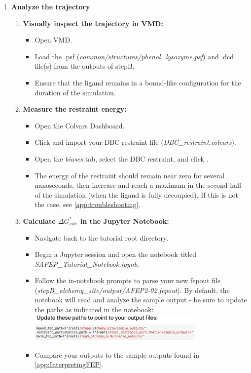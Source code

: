 \documentclass[9pt,tutorial]{Styling/livecoms}
\newcommand{\filepath}[1]{\textit{#1}}
\newcommand{\button}[1]{
  \inlineBox[gray]{\texttt{#1}}
}
\newcommand{\menu}[1]{
  \textit{#1}
}
\begin{document}
\begin{enumerate}
    \item \textbf{Analyze the trajectory}

    
    \begin{enumerate}[label=\alph*., ref=\theenumi.\alph*] \label{step:analyzeSite}
        \item \textbf{Visually inspect the trajectory in VMD:}
        \begin{itemize}
            \item Open VMD.
            \item Load the .psf (\filepath{common/structures/phenol\_lysozyme.psf}) and .dcd file(s) from the outputs of stepB.
            \item Ensure that the ligand remains in a bound-like configuration for the duration of the simulation.
        \end{itemize}
        \item \textbf{Measure the restraint energy:} 
        \begin{itemize}
            \item Open the Colvars Dashboard.
            \item Click \button{Load} and import your DBC restraint file (\filepath{DBC\_restraint.colvars}).
            \item Open the \menu{biases} tab, select the DBC restraint, and click \button{Energy Timeline}.
            \item The energy of the restraint should remain near zero for several nanoseconds, then increase and reach a maximum in the second half of the simulation (when the ligand is fully decoupled). If this is not the case, see \ref{app:troubleshooting}.
        \end{itemize}
        \item \textbf{Calculate $\Delta G^*_{site}$ in the Jupyter Notebook:} \label{step:opennotebook}
        \begin{itemize}
            \item Navigate back to the tutorial root directory.
            \item Begin a Jupyter session and open the notebook titled \filepath{SAFEP\_Tutorial\_Notebook.ipynb}.
            \item Follow the in-notebook prompts to parse your new fepout file  (\filepath{stepB\_alchemy\_site/output/AFEP2-02.fepout}). By default, the notebook will read and analyze the sample output - be sure to update the paths as indicated in the notebook:\\ \includegraphics[width=0.75\textwidth, trim={0 0 0 2cm},clip]{update_paths.png}
            \label{fig:updatePaths}

            \item Compare your outputs to the sample outputs found in \ref{app:InterpretingFEP}.
        \end{itemize}
    \end{enumerate}
\end{enumerate}
\end{document}
